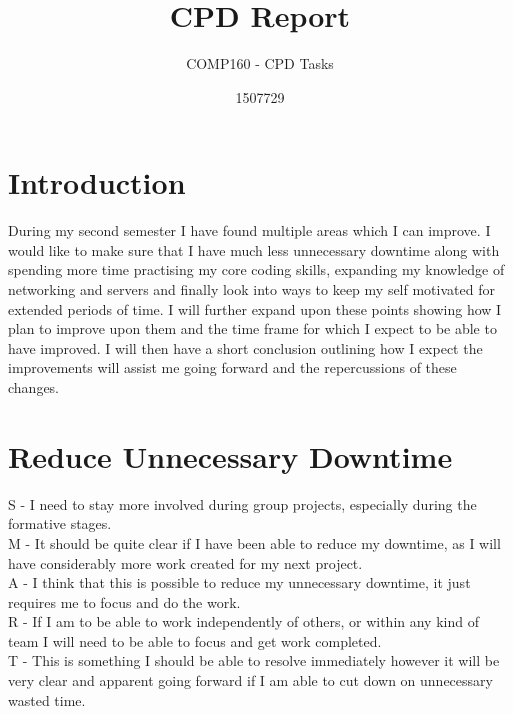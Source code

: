 \documentclass{scrartcl}
\title{CPD Report}
\subtitle{COMP160 - CPD Tasks}
\author{1507729}
\begin{document}
\maketitle

\section{Introduction}

During my second semester I have found multiple areas which I can improve. I would like to make sure that I have much less unnecessary downtime along with spending more time practising my core coding skills, expanding my knowledge of networking and servers and finally look into ways to keep my self motivated for extended periods of time.  I will further expand upon these points showing how I plan to improve upon them and the time frame for which I expect to be able to have improved. I will then have a short conclusion outlining how I expect the improvements will assist me going forward and the repercussions of these changes.

\section{Reduce Unnecessary Downtime}
S - I need to stay more involved during group projects, especially during the formative stages. \\
M - It should be quite clear if I have been able to reduce my downtime, as I will have considerably more work created for my next project. \\
A - I think that this is possible to reduce my unnecessary downtime, it just requires me to focus and do the work. \\
R - If I am to be able to work independently of others, or within any kind of team I will need to be able to focus and get work completed. \\
T - This is something I should be able to resolve immediately however it will be very clear and apparent going forward if I am able to cut down on unnecessary wasted time. \\
\end{document}
